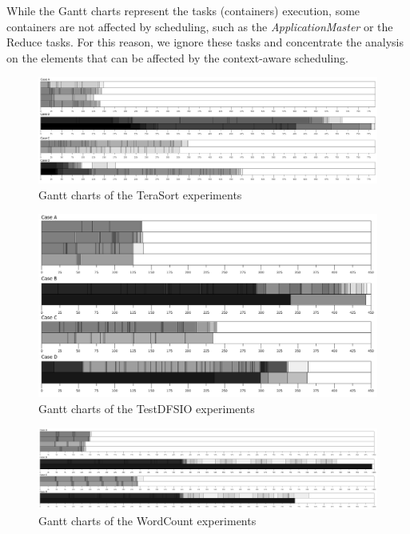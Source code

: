 While the Gantt charts represent the tasks (containers) execution, some containers are not affected by scheduling, such as the \textit{ApplicationMaster} or the Reduce tasks. For this reason, we ignore these tasks and concentrate the analysis on the elements that can be affected by the context-aware scheduling.

\begin{figure}[!ht]
	\centering
	\includegraphics[width=1\textwidth]{img/todos}
	\caption{Gantt charts of the TeraSort experiments}
	\label{fig:gantts}
\end{figure}

\begin{figure}[!ht]
	\centering
	\includegraphics[width=1\textwidth]{img/todos-DFSIO}
	\caption{Gantt charts of the TestDFSIO experiments}
	\label{fig:DFSIO}
\end{figure}

\begin{figure}[!ht]
	\centering
	\includegraphics[width=1\textwidth]{img/todos-WC}
	\caption{Gantt charts of the WordCount experiments}
	\label{fig:WC}
\end{figure}

